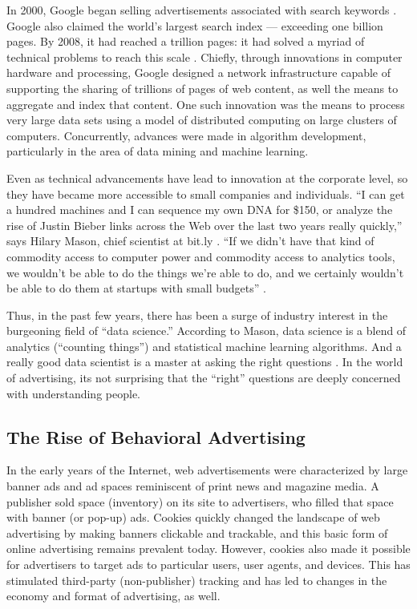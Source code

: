 In 2000, Google began selling advertisements associated with search keywords  \citep{Google:2010:online}.  Google also claimed the world's largest search index --- exceeding one billion pages. By 2008, it had reached a trillion pages: it had solved a myriad of technical problems to reach this scale  \citep{Google:2010:online}.  Chiefly, through innovations in computer hardware and processing, Google designed a network infrastructure capable of supporting the sharing of trillions of pages of web content, as well the means to aggregate and index that content. One such innovation was the means to process very large data sets using a model of distributed computing on large clusters of computers. Concurrently, advances were made in algorithm development, particularly in the area of data mining and machine learning. 

Even as technical advancements have lead to innovation at the corporate level, so they have became more accessible to small companies and individuals. ``I can get a hundred machines and I can sequence my own DNA for \$150, or analyze the rise of Justin Bieber links across the Web over the last two years really quickly,'' says Hilary Mason, chief scientist at bit.ly  \citep[as cited in][]{Woods:y1szIP7L}.  ``If we didn't have that kind of commodity access to computer power and commodity access to analytics tools, we wouldn't be able to do the things we're able to do, and we certainly wouldn't be able to do them at startups with small budgets''  \citep{Woods:y1szIP7L}. 

Thus, in the past few years, there has been a surge of industry interest in the burgeoning field of ``data science.'' According to Mason, data science is a blend of analytics (``counting things'') and statistical machine learning algorithms. And a really good data scientist is a master at asking the right questions  \citep{MachineLearningfor:2012uy}.  In the world of advertising, its not surprising that the ``right'' questions are deeply concerned with understanding people.

\subsection{The Rise of Behavioral Advertising}
\label{theriseofbehavioraladvertising}

In the early years of the Internet, web advertisements were characterized by large banner ads and ad spaces reminiscent of print news and magazine media. A publisher sold space (inventory) on its site to advertisers, who filled that space with banner (or pop-up) ads. Cookies quickly changed the landscape of web advertising by making banners clickable and trackable, and this basic form of online advertising remains prevalent today. However, cookies also made it possible for advertisers to target ads to particular users, user agents, and devices. This has stimulated third-party (non-publisher) tracking and has led to changes in the economy and format of advertising, as well.

